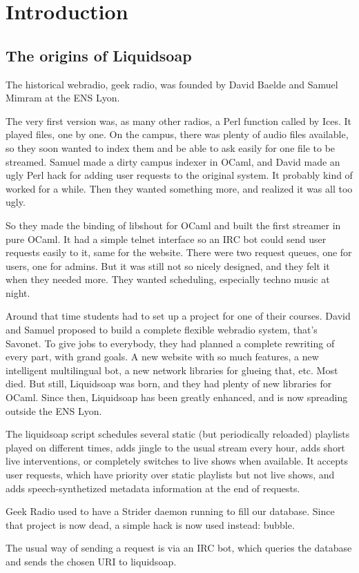 \chapter{Introduction}


\section{The origins of Liquidsoap}
The historical webradio, geek radio, was founded by David Baelde and Samuel
Mimram at the ENS Lyon.

The very first version was, as many other radios, a Perl function called by
Ices. It played files, one by one. On the campus, there was plenty of audio
files available, so they soon wanted to index them and be able to ask easily for
one file to be streamed. Samuel made a dirty campus indexer in OCaml, and David
made an ugly Perl hack for adding user requests to the original system. It
probably kind of worked for a while. Then they wanted something more, and
realized it was all too ugly.

So they made the binding of libshout for OCaml and built the first streamer in
pure OCaml. It had a simple telnet interface so an IRC bot could send user
requests easily to it, same for the website. There were two request queues, one
for users, one for admins. But it was still not so nicely designed, and they
felt it when they needed more. They wanted scheduling, especially techno music
at night.

Around that time students had to set up a project for one of their
courses. David and Samuel proposed to build a complete flexible webradio system,
that's Savonet. To give jobs to everybody, they had planned a complete rewriting
of every part, with grand goals. A new website with so much features, a new
intelligent multilingual bot, a new network libraries for glueing that,
etc. Most died. But still, Liquidsoap was born, and they had plenty of new
libraries for OCaml. Since then, Liquidsoap has been greatly enhanced, and is
now spreading outside the ENS Lyon.

The liquidsoap script schedules several static (but periodically reloaded)
playlists played on different times, adds jingle to the usual stream every hour,
adds short live interventions, or completely switches to live shows when
available. It accepts user requests, which have priority over static playlists
but not live shows, and adds speech-synthetized metadata information at the end
of requests.

Geek Radio used to have a Strider daemon running to fill our database. Since
that project is now dead, a simple hack is now used instead: bubble.

The usual way of sending a request is via an IRC bot, which queries the database
and sends the chosen URI to liquidsoap.
